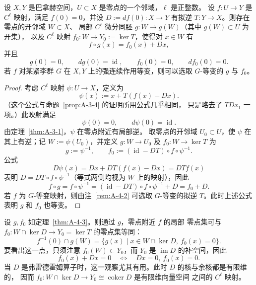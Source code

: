 \begin{theorem}\label{thm:A-4-3}
设 $X,Y$ 是巴拿赫空间，$U\subset X$ 是零点的一个邻域，$\ell$ 是正整数。
设 $f:U\to Y$ 是 $C^\ell$ 映射，满足 $f(0)=0$，并设
$D:=df(0):X\to Y$ 有拟逆 $T:Y\to X$。则存在零点的开邻域 $W\subset X$、
局部 $C^\ell$ 微分同胚 $g:W\to g(W)$（其中 $g(W)\subset U$ 为开集），
以及 $C^\ell$ 映射 $f_0:W\to Y_0:=\ker T$，使得对 $x\in W$ 有
\[
  f\circ g(x)=f_0(x)+Dx,
\]
并且
\[
  g(0)=0,\qquad dg(0)=\operatorname{id},\qquad
  f_0(0)=0,\qquad df_0(0)=0.
\]
若 $f$ 对某紧李群 $G$ 在 $X,Y$ 上的强连续作用等变，则可以选取
$G$-等变的 $g$ 与 $f_0$。
\end{theorem}

\begin{proof}
考虑 $C^\ell$ 映射 $\psi:U\to X$，定义为
\[
  \psi(x):=x+T(f(x)-Dx).
\]
（这个公式与命题~\ref{prop:A-3-4} 的证明所用公式几乎相同，
只是略去了 $TDx_1$ 一项。）此映射满足
\[
  \psi(0)=0,\qquad d\psi(0)=\operatorname{id}.
\]
由定理~\ref{thm:A-3-1}，$\psi$ 在零点附近有局部逆。
取零点的开邻域 $U_0\subset U$，使 $\psi$ 在其上有逆；记
$W:=\psi(U_0)$，并定义 $g:W\to U_0$ 及
$f_0:W\to\ker T$ 为
\[
  g:=\psi^{-1},\qquad
  f_0:=(\operatorname{id}-DT)\circ f\circ\psi^{-1}.
\]
公式
\[
  D\psi(x)=Dx+DT(f(x)-Dx)=DTf(x)
\]
表明 $D=DT\circ f\circ\psi^{-1}$（等式两侧均视为 $W$ 上的映射），因此
\[
  f\circ g=f\circ\psi^{-1}
  =(\operatorname{id}-DT)\circ f\circ\psi^{-1}+D=f_0+D.
\]
若 $f$ 为 $G$-等变映射，则由注~\ref{rem:A-4-2} 可选取
$G$-等变的拟逆 $T$。此时上述公式表明 $g$ 和 $f_0$ 也等变。
\end{proof}

设 $g,f_0$ 如定理~\ref{thm:A-4-3}。则通过 $g$，零点附近 $f$ 的局部
零点集可与 $f_0:W\cap\ker D\to Y_0=\ker T$ 的零点集等同：
\[
  f^{-1}(0)\cap g(W)
  =\bigl\{g(x)\mid x\in W\cap\ker D,\ f_0(x)=0\bigr\}.
\]
要看出这一点，只须注意 $f_0(W)\subset Y_0$，而 $Y_0$ 是
$\operatorname{im}D$ 的补空间，因此
\[
  f_0(x)+Dx=0\quad\Longleftrightarrow\quad Dx=0,\ f_0(x)=0.
\]
当 $D$ 是弗雷德霍姆算子时，这一观察尤其有用。此时 $D$ 的核与余核都是有限维的，
因而 $f_0:W\cap\ker D\to Y_0\cong\operatorname{coker}D$ 是有限维向量空间
之间的 $C^\ell$ 映射。

